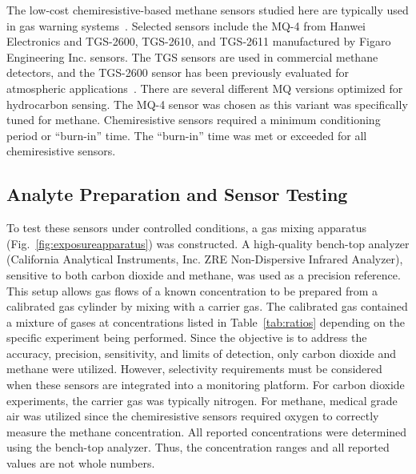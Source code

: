 \documentclass[preprint,sort&compress]{elsarticle}
\begin{document}
			The low-cost chemiresistive-based methane sensors studied here are typically used in gas warning systems~\cite{chiu_towards_2013}.
			Selected sensors include the MQ-4 from Hanwei Electronics and TGS-2600, TGS-2610, and TGS-2611 manufactured by Figaro Engineering Inc. sensors.
			The TGS sensors are used in commercial methane detectors, and the TGS-2600 sensor has been previously evaluated for atmospheric applications~\cite{eugster_performance_2012,bossche_potential_2017}.
			There are several different MQ versions optimized for hydrocarbon sensing.
			The MQ-4 sensor was chosen as this variant was specifically tuned for methane.
			Chemiresistive sensors required a minimum conditioning period or ``burn-in'' time.
			The ``burn-in'' time was met or exceeded for all chemiresistive sensors.
			
		\subsection{Analyte Preparation and Sensor Testing}
			
			To test these sensors under controlled conditions, a gas mixing apparatus (Fig.~\ref{fig:exposureapparatus}) was constructed.
			A high-quality bench-top analyzer (California Analytical Instruments, Inc. ZRE Non-Dispersive Infrared Analyzer), sensitive to both carbon dioxide and methane, was used as a precision reference. This setup allows gas flows of a known concentration to be prepared from a calibrated gas cylinder by mixing with a carrier gas.
			The calibrated gas contained a mixture of gases at concentrations listed in Table~\ref{tab:ratios} depending on the specific experiment being performed.
			Since the objective is to address the accuracy, precision, sensitivity, and limits of detection, only carbon dioxide and methane were utilized.
			However, selectivity requirements must be considered when these sensors are integrated into a monitoring platform.
			For carbon dioxide experiments, the carrier gas was typically nitrogen.
			For methane, medical grade air was utilized since the chemiresistive sensors required oxygen to correctly measure the methane concentration.
			All reported concentrations were determined using the bench-top analyzer.
			Thus, the concentration ranges and all reported values are not whole numbers.
			
\end{document}

